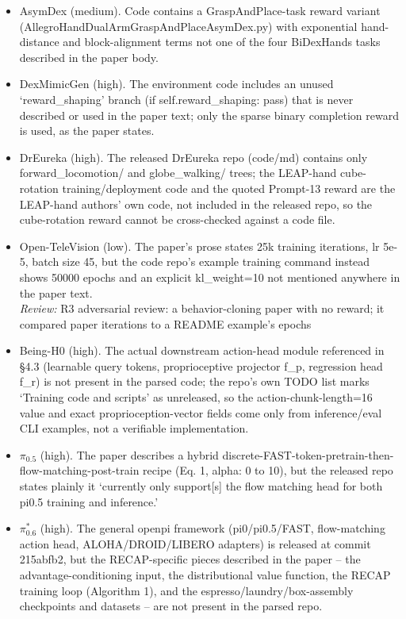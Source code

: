 \begin{itemize}
\item AsymDex \cite{asymdex_2024} (medium). Code contains a GraspAndPlace-task reward variant (AllegroHandDualArmGraspAndPlaceAsymDex.py) with exponential hand-distance and block-alignment terms not one of the four BiDexHands tasks described in the paper body.
\item DexMimicGen \cite{dexmimicgen_2024} (high). The environment code includes an unused `reward\_\allowbreak{}shaping' branch (if self.reward\_\allowbreak{}shaping: pass) that is never described or used in the paper text; only the sparse binary completion reward is used, as the paper states.
\item DrEureka \cite{dreureka_2024} (high). The released DrEureka repo (code/md) contains only forward\_\allowbreak{}locomotion/ and globe\_\allowbreak{}walking/ trees; the LEAP-hand cube-rotation training/deployment code and the quoted Prompt-13 reward are the LEAP-hand authors' own code, not included in the released repo, so the cube-rotation reward cannot be cross-checked against a code file.
\item Open-TeleVision \cite{open_television_2024} (low). The paper's prose states 25k training iterations, lr 5e-5, batch size 45, but the code repo's example training command instead shows 50000 epochs and an explicit kl\_\allowbreak{}weight=10 not mentioned anywhere in the paper text.
  \\ \emph{Review:} R3 adversarial review: a behavior-cloning paper with no reward; it compared paper iterations to a README example's epochs
\item Being-H0 \cite{being_h0_2025} (high). The actual downstream action-head module referenced in \S4.3 (learnable query tokens, proprioceptive projector f\_\allowbreak{}p, regression head f\_\allowbreak{}r) is not present in the parsed code; the repo's own TODO list marks `Training code and scripts' as unreleased, so the action-chunk-length=16 value and exact proprioception-vector fields come only from inference/eval CLI examples, not a verifiable implementation.
\item $\pi_{0.5}$ \cite{pi05_2025} (high). The paper describes a hybrid discrete-FAST-token-pretrain-then-flow-matching-post-train recipe (Eq. 1, alpha: 0 to 10), but the released repo states plainly it `currently only support[s] the flow matching head for both pi0.5 training and inference.'
\item $\pi^{*}_{0.6}$ \cite{pistar06_2025} (high). The general openpi framework (pi0/pi0.5/FAST, flow-matching action head, ALOHA/DROID/LIBERO adapters) is released at commit 215abfb2, but the RECAP-specific pieces described in the paper -- the advantage-conditioning input, the distributional value function, the RECAP training loop (Algorithm 1), and the espresso/laundry/box-assembly checkpoints and datasets -- are not present in the parsed repo.

\end{itemize}
